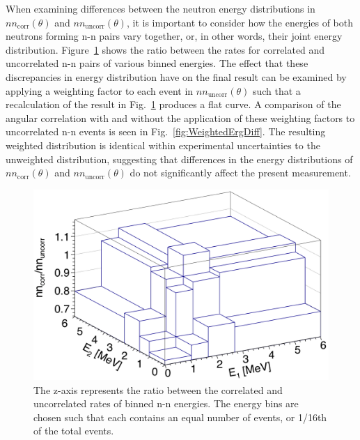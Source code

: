 When examining differences between the neutron energy distributions in $nn_{\text{corr}}(\theta)$ and $nn_{\text{uncorr}}(\theta)$, it is important to consider how the energies of both neutrons forming n-n pairs vary together, or, in other words, their joint energy distribution.
Figure~\ref{fig:ErgDiffLego} shows the ratio between the rates for correlated and uncorrelated n-n pairs of various binned energies.
The effect that these discrepancies in energy distribution have on the final result can be examined by applying a weighting factor to each event in $nn_{\text{uncorr}}(\theta)$ such that a recalculation of the result in Fig.~\ref{fig:ErgDiffLego} produces a flat curve.
A comparison of the angular correlation with and without the application of these weighting factors to uncorrelated n-n events is seen in Fig.~\ref{fig:WeightedErgDiff}.
The resulting weighted distribution is identical within experimental uncertainties to the unweighted distribution, suggesting that differences in the energy distributions of $nn_{\text{corr}}(\theta)$ and $nn_{\text{uncorr}}(\theta)$ do not significantly affect the present measurement.
\begin{figure}[]
\centering
    \includegraphics[width=\figsize\textwidth]{ErgDiffLego.png}
    \caption{
    The z-axis represents the ratio between the correlated and uncorrelated rates of binned n-n energies.
    The energy bins are chosen such that each contains an equal number of events, or 1/16th of the total events.
    }
    \label{fig:ErgDiffLego}
\end{figure}
